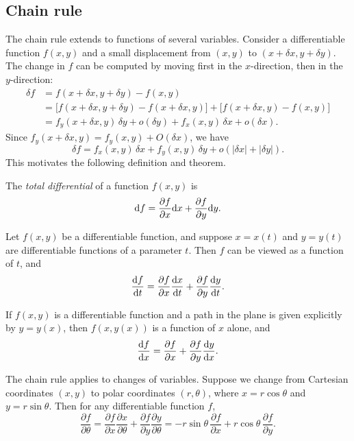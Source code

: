 \documentclass[a4paper]{article}
\begin{document}
\subsection{Chain rule}
The chain rule extends to functions of several variables. Consider a differentiable function $f(x, y)$ and a small displacement from $(x, y)$ to $(x+\delta x, y + \delta y)$. The change in $f$ can be computed by moving first in the $x$-direction, then in the $y$-direction:
\begin{align*}
  \delta f &= f(x+\delta x, y + \delta y) - f(x, y)\\
  &= \bigl[f(x+\delta x, y + \delta y) - f(x + \delta x, y)\bigr] + \bigl[f(x+\delta x, y) - f(x, y)\bigr]\\
  &= f_y(x + \delta x, y)\,\delta y + o(\delta y) + f_x(x, y)\,\delta x + o(\delta x).
\end{align*}
Since $f_y(x + \delta x, y) = f_y(x, y) + O(\delta x)$, we have
\[
  \delta f = f_x(x, y)\,\delta x + f_y(x, y)\,\delta y + o(|\delta x| + |\delta y|).
\]
This motivates the following definition and theorem.

\begin{defi}
  The \emph{total differential} of a function $f(x,y)$ is
  \[
    \mathrm{d} f = \frac{\partial f}{\partial x}\mathrm{d} x + \frac{\partial f}{\partial y}\mathrm{d} y.
  \]
\end{defi}

\begin{thm}
  Let $f(x, y)$ be a differentiable function, and suppose $x = x(t)$ and $y = y(t)$ are differentiable functions of a parameter $t$. Then $f$ can be viewed as a function of $t$, and
  \[
    \frac{\mathrm{d} f}{\mathrm{d} t} = \frac{\partial f}{\partial x}\frac{\mathrm{d} x}{\mathrm{d} t} + \frac{\partial f}{\partial y}\frac{\mathrm{d} y}{\mathrm{d} t}.
  \]
\end{thm}

\begin{cor}
  If $f(x, y)$ is a differentiable function and a path in the plane is given explicitly by $y = y(x)$, then $f(x, y(x))$ is a function of $x$ alone, and
  \[
    \frac{\mathrm{d} f}{\mathrm{d} x} = \frac{\partial f}{\partial x} + \frac{\partial f}{\partial y}\frac{\mathrm{d} y}{\mathrm{d} x}.
  \]
\end{cor}

\begin{eg}
  The chain rule applies to changes of variables. Suppose we change from Cartesian coordinates $(x, y)$ to polar coordinates $(r, \theta)$, where $x = r\cos\theta$ and $y = r\sin\theta$. Then for any differentiable function $f$,
  \[
    \frac{\partial f}{\partial \theta} = \frac{\partial f}{\partial x}\frac{\partial x}{\partial \theta} + \frac{\partial f}{\partial y}\frac{\partial y}{\partial \theta} = -r\sin\theta\,\frac{\partial f}{\partial x} + r\cos\theta\,\frac{\partial f}{\partial y}.
  \]
\end{eg}
\end{document}
